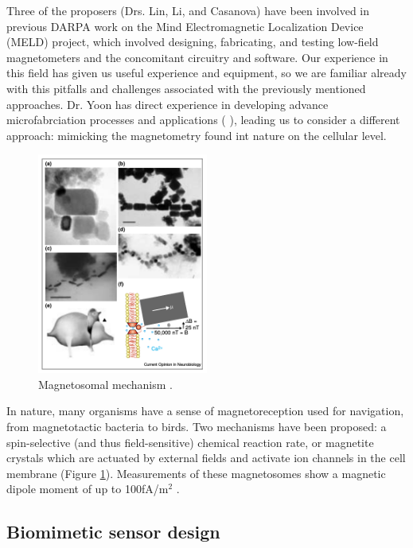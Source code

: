 Three of the proposers (Drs. Lin, Li, and Casanova) have been involved in previous DARPA work on the Mind Electromagnetic Localization Device (MELD) project, which involved designing, fabricating, and testing low-field magnetometers and the concomitant circuitry and software. Our experience in this field has given us useful experience and equipment, so we are familiar already with this pitfalls and challenges associated with the previously mentioned approaches. Dr. Yoon has direct experience in developing advance microfabrciation processes and applications (
\cite{yoon2003reduced,yoon2006multidirectional}), leading us to consider a different approach: mimicking the magnetometry found int nature on the cellular level.

\begin{figure}
\centering
\includegraphics[width=0.5\textwidth]{kirsh2001}
\caption{Magnetosomal mechanism \cite{kirschvink2001magnetite}.}
\label{fig:magnetosome}
\end{figure}

In nature, many organisms have a sense of magnetoreception used for navigation, from magnetotactic bacteria to birds. Two mechanisms have been proposed: a spin-selective (and thus field-sensitive) chemical reaction rate, or magnetite crystals which are actuated by external fields and activate ion channels in the cell membrane (Figure \ref{fig:magnetosome})\cite{johnsen2005physics,dodson2013radical,kirschvink2001magnetite}. Measurements of these magnetosomes show a magnetic dipole moment of up to 100fA/m$^2$ \cite{hanzlik2002pulsed,eder2012magnetic}.


\subsection{Biomimetic sensor design}

